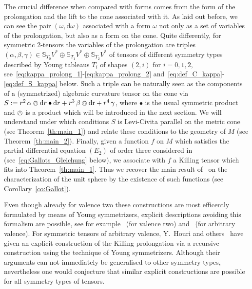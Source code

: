 \documentclass[11pt,a4paper]{article}
\theoremstyle{plain}
\theoremstyle{remark}
\newcommand{\dr}{\mathrm{dr}}
\renewcommand{\d}{\mathrm{d}}
\newcommand{\bbS}{\mathbb{S}}
\begin{document}
The crucial difference when compared with forms comes from the form of the prolongation and the lift to the cone associated with it. As laid out before, we can see the pair $(\omega,\d\omega)$ associated with a form $\omega$ not only as a set of variables of the prolongation, but also as a form on the  cone. %
Quite differently, for symmetric 2-tensors the variables of the prolongation are triples $(\alpha,\beta,\gamma)\in \bbS_{T_0}V^*\oplus \bbS_{T_1}V^*\oplus\bbS_{T_2}V^*$ of tensors of different symmetry types described by Young tableaus $T_i$ of shapes $(2,i)$ for $i =0,1,2$,
see~\eqref{eq:kappa_prolong_1}-\eqref{eq:kappa_prolong_2} and~\eqref{eq:def_C_kappa}-\eqref{eq:def_S_kappa} below. 
Such a triple can be  naturally seen as the components of a (symmetrized) algebraic curvature tensor on the cone via $S :=  r^2\, \alpha\owedge \d r\bullet \d r + r^3\, \beta\owedge \dr  + r^4\, \gamma$, where $\bullet$ is the usual symmetric product and $\owedge$ is a product which will be introduced in the next section. We will understand under which conditions $S$ is Levi-Civita parallel on the metric cone (see Theorem~\ref{th:main_1}) and relate these conditions to the geometry of $M$ (see Theorem~\ref{th:main_2}). Finally, given a function $f$ on $M$ which satisfies the partial differential equation $(E_2)$ of order three considered in~\cite{Ga} (see~\eqref{eq:Gallots_Gleichung} below), 
we associate with $f$  a Killing tensor which fits into Theorem~\ref{th:main_1}. Thus we recover the main result of~\cite{Ga} on the characterization of the unit sphere by the existence of such functions 
(see Corollary~\ref{co:Gallot}). 

Even though already for valence two these constructions are most efficently formulated  by means of
Young symmetrizers, explicit descriptions avoiding this formalism are possible,
see for example~\cite{HM} (for valence two) and~\cite{Th,W} (for arbitrary valence). For symmetric tensors of arbitrary valence, Y.~Houri and others~\cite{HTY} have given an explicit construction of the Killing prolongation via a recursive construction 
using the technique of Young symmetrizers. Although their arguments can not immediately be generalised to other symmetry types, 
nevertheless one would conjecture that similar explicit constructions are possible for all symmetry types of tensors. 
\end{document}
